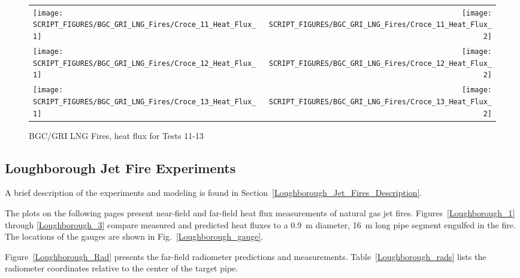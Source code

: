 \begin{figure}[p]
\begin{tabular*}{\textwidth}{l@{\extracolsep{\fill}}r}
\texttt{[image: SCRIPT\_FIGURES/BGC\_GRI\_LNG\_Fires/Croce\_11\_Heat\_Flux\_1]} &
\texttt{[image: SCRIPT\_FIGURES/BGC\_GRI\_LNG\_Fires/Croce\_11\_Heat\_Flux\_2]} \\
\texttt{[image: SCRIPT\_FIGURES/BGC\_GRI\_LNG\_Fires/Croce\_12\_Heat\_Flux\_1]} &
\texttt{[image: SCRIPT\_FIGURES/BGC\_GRI\_LNG\_Fires/Croce\_12\_Heat\_Flux\_2]} \\
\texttt{[image: SCRIPT\_FIGURES/BGC\_GRI\_LNG\_Fires/Croce\_13\_Heat\_Flux\_1]} &
\texttt{[image: SCRIPT\_FIGURES/BGC\_GRI\_LNG\_Fires/Croce\_13\_Heat\_Flux\_2]}
\end{tabular*}
\caption[BGC/GRI LNG Fires, heat flux for Tests 11-13]
{BGC/GRI LNG Fires, heat flux for Tests 11-13}
\label{Croce_Heat_Flux_4}
\end{figure}


\clearpage

\subsection{Loughborough Jet Fire Experiments}

A brief description of the experiments and modeling is found in Section~\ref{Loughborough_Jet_Fires_Description}.

The plots on the following pages present near-field and far-field heat flux measurements of natural gas jet fires. Figures~\ref{Loughborough_1} through \ref{Loughborough_3} compare measured and predicted heat fluxes to a 0.9~m diameter, 16~m long pipe segment engulfed in the fire. The locations of the gauges are shown in Fig.~\ref{Loughborough_gauge}. 

Figure~\ref{Loughborough_Rad} presents the far-field radiometer predictions and measurements. Table~\ref{Loughborough_rads} lists the radiometer coordinates relative to the center of the target pipe.

